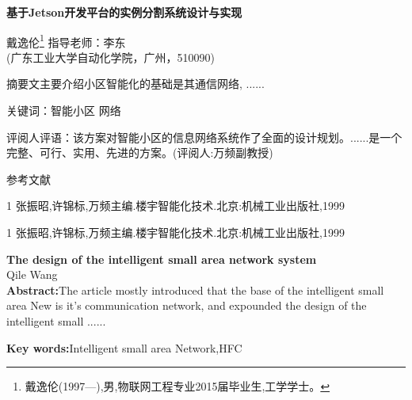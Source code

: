 \documentclass[openright, twoside]{gdutthesis-excellent}
\begin{document}
\renewcommand{\baselinestretch}{1.5}
{\centering
\vspace*{20pt}
\bfseries
基于Jetson开发平台的实例分割系统设计与实现\par
\vspace*{16pt}
\normalfont {}\kaishu
  戴逸伦\footnote{戴逸伦(1997—),男,物联网工程专业2015届毕业生,工学学士。} \quad\quad 指导老师：李东\\
  (广东工业大学自动化学院，广州，510090)\\

}

\renewcommand{\baselinestretch}{1.46}
\begin{flushleft}
\setlength\leftskip{2em}
\setlength\rightskip{2em}
\setlength{\parindent}{4em}
\kaishu{}
{\quad\quad\heiticu 摘\quad 要}文主要介绍小区智能化的基础是其通信网络, ......\par
{\heiticu 关键词：}智能小区 网络\par
{\heiticu 评阅人评语：}该方案对智能小区的信息网络系统作了全面的设计规划。......是一个完整、可行、实用、先进的方案。(评阅人:万频副教授)\par
\end{flushleft}



\setlength{\baselineskip}{10pt}
\renewcommand{\baselinestretch}{1}
\begin{center}
\heiticu 参考文献
\end{center}

\renewcommand{\baselinestretch}{1.2}
\kaishu
\setlength{\parindent}{0em}
1 张振昭,许锦标,万频主编.楼宇智能化技术.北京:机械工业出版社,1999\par
1 张振昭,许锦标,万频主编.楼宇智能化技术.北京:机械工业出版社,1999\par

\vspace{36pt}

\renewcommand{\baselinestretch}{1}
{
\centering
{}\textbf{The design of the intelligent small area network system}\\
 Qile Wang\\
}
\textbf{Abstract:}The article mostly introduced that the base of the intelligent small area New is it's communication network, and expounded the design of the intelligent small ......\par
\textbf{Key words:}Intelligent small area Network,HFC\par
\end{document}
